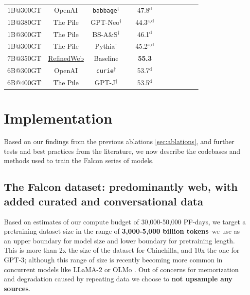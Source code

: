 \documentclass{article}
\begin{document}
\begin{table}[h!]
\begin{small}
\begin{tabular}{ccccccccccc}
   1B@300GT & OpenAI & \texttt{babbage}$^\dagger$ & & 47.8$^\text{d}$ & & \\
   1B@380GT & The Pile & GPT-Neo$^\dagger$ & & 44.3$^\text{a,d}$ & & \\
   1B@300GT & The Pile & BS-A\&S$^\dagger$ & & 46.1$^\text{d}$ & & \\
   1B@300GT & The Pile & Pythia$^\dagger$ & & 45.2$^\text{a,d}$ & & \\
\midrule \midrule
7B@350GT & \underline{RefinedWeb} & Baseline & & \textbf{55.3} & & \\
6B@300GT & OpenAI & \texttt{curie}$^\dagger$ & & 53.7$^\text{d}$ & & \\
6B@400GT & The Pile & GPT-J$^\dagger$ & & 53.5$^\text{d}$ & & \\
\bottomrule
\end{tabular}
\vspace{-0.2in}
\end{small}

\end{table}


\section{Implementation}
\label{sec:implementation}

Based on our findings from the previous ablations \cref{sec:ablations}, and further tests and best practices from the literature, we now describe the codebases and methods used to train the Falcon series of models.  

\subsection{The Falcon dataset: predominantly web, with added curated and conversational data}
\label{sec:implem_data}

Based on estimates of our compute budget of 30,000-50,000 PF-days, we target a pretraining dataset size in the range of \textbf{3,000-5,000 billion tokens}--we use \citet{hoffmann2022training} as an upper boundary for model size and lower boundary for pretraining length. This is more than 2x the size of the dataset for Chinchilla, and 10x the one for GPT-3; although this range of size is recently becoming more common in concurrent models like LLaMA-2 or OLMo \citep{llama2, dolma}. Out of concerns for memorization and degradation caused by repeating data \citep{carlini2022quantifying, hernandez2022scaling} we choose to \textbf{not upsample any sources}. 
\end{document}

